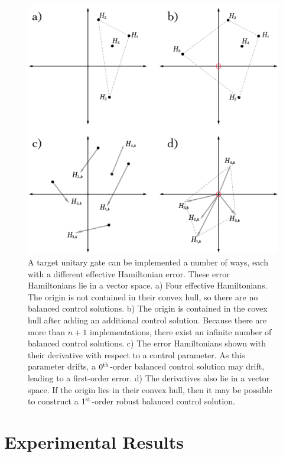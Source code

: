 \documentclass[aps,nofootinbib,pra,notitlepage,twocolumn]{revtex4-1}
\begin{document}
\begin{figure}
  \centering
  \includegraphics[width=\columnwidth]{vectorspace.pdf}
  \caption{A target unitary gate can be implemented a number of ways, each with a different effective Hamiltonian error. These error Hamiltonians lie in a vector space. a) Four effective Hamiltonians. The origin is not contained in their convex hull, so there are no balanced control solutions. b) The origin is contained in the covex hull after adding an additional control solution. Because there are more than $n+1$ implementations, there exist an infinite number of balanced control solutions. c) The error Hamiltonians shown with their derivative with respect to a control parameter. As this parameter drifts, a $0^{\rm th}$-order balanced control solution may drift, leading to a first-order error. d) The derivatives also lie in a vector space. If the origin lies in their convex hull, then it may be possible to construct a $1^{\rm{st}}$-order robust balanced control solution.}
  \label{fig:vectorspace}
\end{figure}




\section{Experimental Results}
\label{sec:experimental_results}
\end{document}
